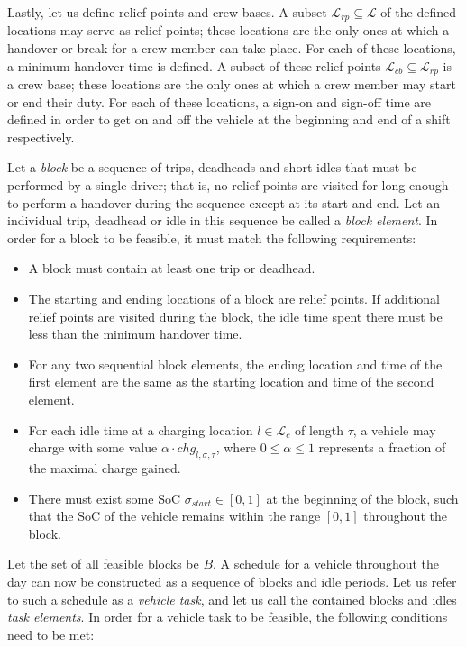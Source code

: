 \documentclass[]{article}
\begin{document}
Lastly, let us define relief points and crew bases. A subset $\mathcal{L}_{rp} \subseteq \mathcal{L}$ of the defined locations may serve as relief points; these locations are the only ones at which a handover or break for a crew member can take place. For each of these locations, a minimum handover time is defined. A subset of these relief points $\mathcal{L}_{cb} \subseteq \mathcal{L}_{rp}$ is a crew base; these locations are the only ones at which a crew member may start or end their duty. For each of these locations, a sign-on and sign-off time are defined in order to get on and off the vehicle at the beginning and end of a shift respectively. \newline

\noindent Let a \emph{block} be a sequence of trips, deadheads and short idles that must be performed by a single driver; that is, no relief points are visited for long enough to perform a handover during the sequence except at its start and end. Let an individual trip, deadhead or idle in this sequence be called a \emph{block element}. In order for a block to be feasible, it must match the following requirements: 
\begin{itemize}
  \item A block must contain at least one trip or deadhead.
  \item The starting and ending locations of a block are relief points. If additional relief points are visited during the block, the idle time spent there must be less than the minimum handover time.
  \item For any two sequential block elements, the ending location and time of the first element are the same as the starting location and time of the second element.
  \item For each idle time at a charging location $l \in \mathcal{L}_c$ of length $\tau$, a vehicle may charge with some value $\alpha \cdot chg_{l,\sigma,\tau}$, where $0 \leq \alpha \leq 1$ represents a fraction of the maximal charge gained. 
  \item There must exist some SoC $\sigma_{start} \in [0, 1]$ at the beginning of the block, such that the SoC of the vehicle remains within the range $[0, 1]$ throughout the block.
\end{itemize}
Let the set of all feasible blocks be $B$. A schedule for a vehicle throughout the day can now be constructed as a sequence of blocks and idle periods. Let us refer to such a schedule as a \textit{vehicle task}, and let us call the contained blocks and idles \emph{task elements}. In order for a vehicle task to be feasible, the following conditions need to be met:
\end{document}

